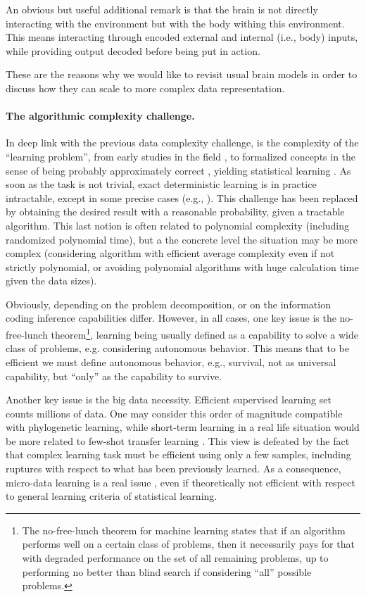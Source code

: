 \documentclass[a4,12pt]{article}
\begin{document}
An obvious but useful additional remark is that the brain is not directly interacting with the environment but with the body withing this environment. This means interacting through encoded external and internal (i.e., body) inputs, while providing output decoded before being put in action. 

These are the reasons why we would like to revisit usual brain models in order to discuss how they can scale to more complex data representation.

\paragraph{The algorithmic complexity challenge.}

In deep link with the previous data complexity challenge, is the complexity of the ``learning problem'', from early studies in the field \cite{bush-mosteller:57}, to formalized concepts in the sense of being probably approximately correct \cite{valiant2013probably}, yielding statistical learning \cite{vapnik:98,cucker-smale:01}. As soon as the task is not trivial, exact deterministic learning is in practice intractable, except in some precise cases (e.g., \cite{angluin1983inductive}). This challenge has been replaced by obtaining the desired result with a reasonable probability, given a tractable algorithm. This last notion is often related to polynomial complexity (including randomized polynomial time), but a the concrete level the situation may be more complex (considering algorithm with efficient average complexity even if not strictly polynomial, or avoiding polynomial algorithms with huge calculation time given the data sizes).

 Obviously, depending on the problem decomposition, or on the information coding inference capabilities differ. However, in all cases, one key issue is the no-free-lunch theorem\footnote{The no-free-lunch theorem for machine learning states that if an algorithm performs well on a certain class of problems, then it necessarily pays for that with degraded performance on the set of all remaining problems, up to performing no better than blind search if considering ``all'' possible problems.}, learning being usually defined as a capability to solve a wide class of problems, e.g. considering autonomous behavior. This means that to be efficient we must define autonomous behavior, e.g., survival, not as universal capability, but ``only'' as the capability to survive.

Another key issue is the big data necessity. Efficient supervised learning set counts millions of data. One may consider this order of magnitude compatible with phylogenetic learning, while short-term learning in a real life situation would be more related to few-shot transfer learning \cite{Ruder2017Transfer}. This view is defeated by the fact that complex learning task must be efficient using only a few samples, including ruptures with respect to what has been previously learned. As a consequence, micro-data learning is a real issue \cite{mouret2016micro}, even if theoretically not efficient with respect to general learning criteria of statistical learning.
\end{document}
